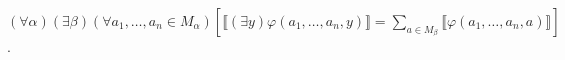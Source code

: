 $(\forall \alpha)(\exists \beta)(\forall a_1, \ldots, a_n \in M_{\alpha}) \left[ \llbracket (\exists y) \varphi(a_1, \ldots, a_n, y) \rrbracket = \sum_{a \in M_{\beta}} \llbracket \varphi(a_1, \ldots, a_n, a) \rrbracket \right]$.

